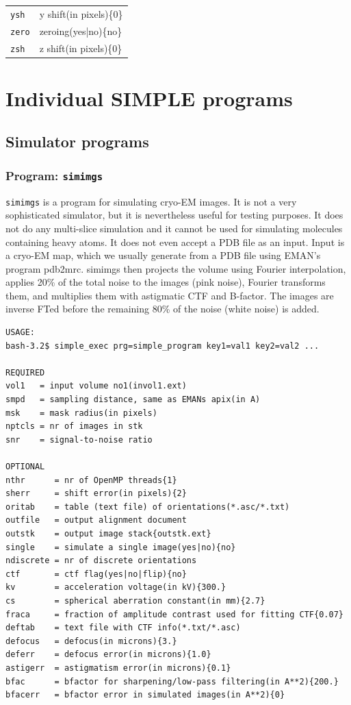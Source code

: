 \documentclass[a4paper,11pt]{article}
\newcommand{\prgname}[1]{\textcolor{NavyBlue}{\texttt{#1}}}
\begin{document}
\begin{tabular}{ll}
\texttt{ysh}&{y shift(in pixels)\{0\}}\\
\texttt{zero}&{zeroing(yes|no)\{no\}}\\
\texttt{zsh}&{z shift(in pixels)\{0\}}\\
\end{tabular}

\section{Individual SIMPLE programs}

\subsection{Simulator programs}

\subsubsection{Program: \prgname{simimgs}}
\label{simimgs}
\prgname{simimgs} is a program for simulating cryo-EM images. It is not a very sophisticated simulator, but it is nevertheless useful for testing purposes. It does not do any multi-slice simulation and it cannot be used for simulating molecules containing heavy atoms. It does not even accept a PDB file as an input. Input is a cryo-EM map, which we usually generate from a PDB file using EMAN's program pdb2mrc. simimgs then projects the volume using Fourier interpolation, applies 20\% of the total noise to the images (pink noise), Fourier transforms them, and multiplies them with astigmatic CTF and B-factor. The images are inverse FTed before the remaining 80\% of the noise (white noise) is added.

\begin{verbatim}
USAGE:
bash-3.2$ simple_exec prg=simple_program key1=val1 key2=val2 ...

REQUIRED
vol1   = input volume no1(invol1.ext)
smpd   = sampling distance, same as EMANs apix(in A)
msk    = mask radius(in pixels)
nptcls = nr of images in stk
snr    = signal-to-noise ratio

OPTIONAL
nthr      = nr of OpenMP threads{1}
sherr     = shift error(in pixels){2}
oritab    = table (text file) of orientations(*.asc/*.txt)
outfile   = output alignment document
outstk    = output image stack{outstk.ext}
single    = simulate a single image(yes|no){no}
ndiscrete = nr of discrete orientations
ctf       = ctf flag(yes|no|flip){no}
kv        = acceleration voltage(in kV){300.}
cs        = spherical aberration constant(in mm){2.7}
fraca     = fraction of amplitude contrast used for fitting CTF{0.07}
deftab    = text file with CTF info(*.txt/*.asc)
defocus   = defocus(in microns){3.}
deferr    = defocus error(in microns){1.0}
astigerr  = astigmatism error(in microns){0.1}
bfac      = bfactor for sharpening/low-pass filtering(in A**2){200.}
bfacerr   = bfactor error in simulated images(in A**2){0}
\end{verbatim}
\end{document}
